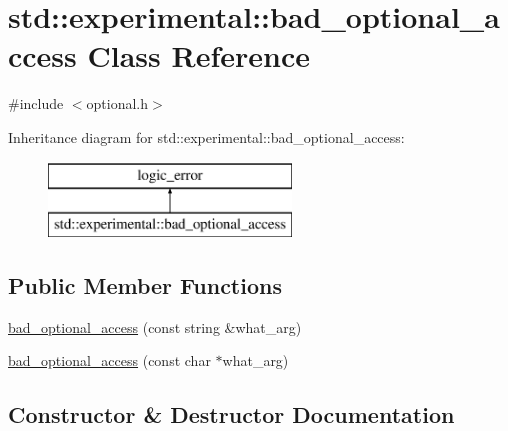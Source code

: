 \hypertarget{classstd_1_1experimental_1_1bad__optional__access}{}\section{std\+:\+:experimental\+:\+:bad\+\_\+optional\+\_\+access Class Reference}
\label{classstd_1_1experimental_1_1bad__optional__access}


{\ttfamily \#include $<$optional.\+h$>$}

Inheritance diagram for std\+:\+:experimental\+:\+:bad\+\_\+optional\+\_\+access\+:\begin{figure}[H]
\begin{center}
\leavevmode
\includegraphics[height=2.000000cm]{classstd_1_1experimental_1_1bad__optional__access}
\end{center}
\end{figure}
\subsection*{Public Member Functions}
\begin{DoxyCompactItemize}
\item 
\mbox{\hyperlink{classstd_1_1experimental_1_1bad__optional__access_a5788e13d3c7419ab5e781274e102d0f2}{bad\+\_\+optional\+\_\+access}} (const string \&what\+\_\+arg)
\item 
\mbox{\hyperlink{classstd_1_1experimental_1_1bad__optional__access_a75d7625c06d41839667c6cc9ce144bd1}{bad\+\_\+optional\+\_\+access}} (const char $\ast$what\+\_\+arg)
\end{DoxyCompactItemize}


\subsection{Constructor \& Destructor Documentation}
\mbox{\label{classstd_1_1experimental_1_1bad__optional__access_a5788e13d3c7419ab5e781274e102d0f2}} 
